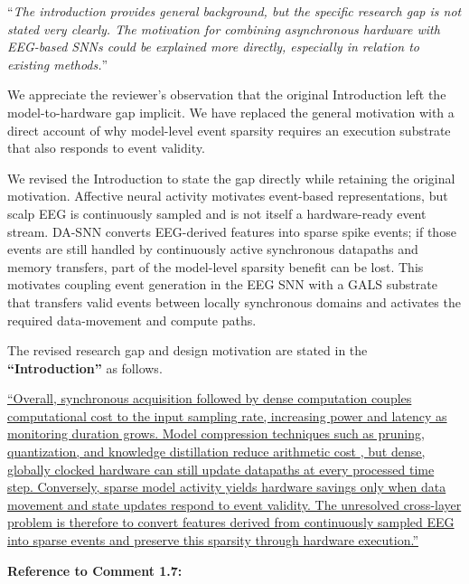 \documentclass[12pt,technote,onecolumn]{IEEEtran}
\begin{document}
\vspace{4mm}

``{\it The introduction provides general background, but the specific research
gap is not stated very clearly. The motivation for combining
asynchronous hardware with EEG-based SNNs could be explained more
directly, especially in relation to existing methods.}''
\vspace{1mm}


We appreciate the reviewer's observation that the original Introduction left the model-to-hardware gap implicit. We have replaced the general motivation with a direct account of why model-level event sparsity requires an execution substrate that also responds to event validity.

We revised the Introduction to state the gap directly while retaining
the original motivation. Affective neural activity motivates event-based
representations, but scalp EEG is continuously sampled and is not itself
a hardware-ready event stream. DA-SNN converts EEG-derived features into
sparse spike events; if those events are still handled by continuously
active synchronous datapaths and memory transfers, part of the
model-level sparsity benefit can be lost. This motivates coupling event
generation in the EEG SNN with a GALS substrate that transfers valid
events between locally synchronous domains and activates the required
data-movement and compute paths.



The revised research gap and design motivation are stated in the \textbf{``Introduction''} as follows.

\uline{``Overall, synchronous acquisition followed by dense computation couples computational cost to the input sampling rate, increasing power and latency as monitoring duration grows. Model compression techniques such as pruning, quantization, and knowledge distillation reduce arithmetic cost \cite{ref25,ref26,ref77}, but dense, globally clocked hardware can still update datapaths at every processed time step. Conversely, sparse model activity yields hardware savings only when data movement and state updates respond to event validity. The unresolved cross-layer problem is therefore to convert features derived from continuously sampled EEG into sparse events and preserve this sparsity through hardware execution.''}

\noindent \textbf{Reference to Comment 1.7:}
\end{document}
